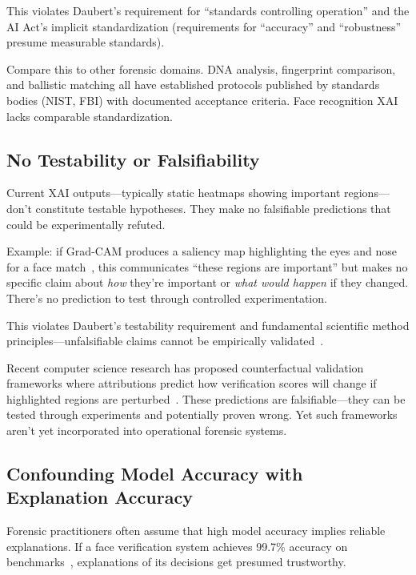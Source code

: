 This violates Daubert's requirement for ``standards controlling operation'' and the AI Act's implicit standardization (requirements for ``accuracy'' and ``robustness'' presume measurable standards).

Compare this to other forensic domains. DNA analysis, fingerprint comparison, and ballistic matching all have established protocols published by standards bodies (NIST, FBI) with documented acceptance criteria. Face recognition XAI lacks comparable standardization.

\subsection{No Testability or Falsifiability}

Current XAI outputs—typically static heatmaps showing important regions—don't constitute testable hypotheses. They make no falsifiable predictions that could be experimentally refuted.

Example: if Grad-CAM produces a saliency map highlighting the eyes and nose for a face match~\cite{selvaraju2017gradcam}, this communicates ``these regions are important'' but makes no specific claim about \emph{how} they're important or \emph{what would happen} if they changed. There's no prediction to test through controlled experimentation.

This violates Daubert's testability requirement and fundamental scientific method principles—unfalsifiable claims cannot be empirically validated~\cite{daubert1993}.

Recent computer science research has proposed counterfactual validation frameworks where attributions predict how verification scores will change if highlighted regions are perturbed~\cite{wachter2017counterfactual}. These predictions are falsifiable—they can be tested through experiments and potentially proven wrong. Yet such frameworks aren't yet incorporated into operational forensic systems.

\subsection{Confounding Model Accuracy with Explanation Accuracy}

Forensic practitioners often assume that high model accuracy implies reliable explanations. If a face verification system achieves 99.7\% accuracy on benchmarks~\cite{deng2019arcface}, explanations of its decisions get presumed trustworthy.

